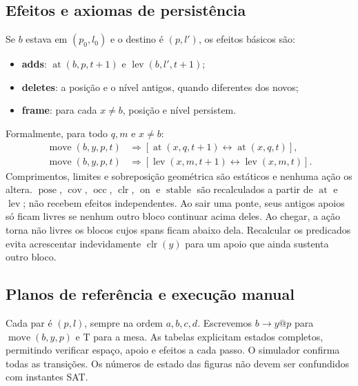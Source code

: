 \documentclass[11pt,a4paper]{article}
\newcommand{\at}{\operatorname{at}}
\newcommand{\lev}{\operatorname{lev}}
\newcommand{\clr}{\operatorname{clr}}
\newcommand{\On}{\operatorname{on}}
\newcommand{\cov}{\operatorname{cov}}
\newcommand{\occ}{\operatorname{occ}}
\newcommand{\pose}{\operatorname{pose}}
\newcommand{\stable}{\operatorname{stable}}
\newcommand{\mv}{\operatorname{move}}
\newcommand{\T}{\mathrm{T}}
\begin{document}
\subsection{Efeitos e axiomas de persistência}
Se $b$ estava em $(p_0,l_0)$ e o destino é $(p,l')$, os efeitos básicos são:
\begin{itemize}
\item \textbf{adds}: $\at(b,p,t+1)$ e $\lev(b,l',t+1)$;
\item \textbf{deletes}: a posição e o nível antigos, quando diferentes dos novos;
\item \textbf{frame}: para cada $x\neq b$, posição e nível persistem.
\end{itemize}
Formalmente, para todo $q,m$ e $x\neq b$:
\begin{align}
\mv(b,y,p,t)&\Rightarrow[\at(x,q,t+1)\leftrightarrow\at(x,q,t)],\\
\mv(b,y,p,t)&\Rightarrow[\lev(x,m,t+1)\leftrightarrow\lev(x,m,t)].
\end{align}
Comprimentos, limites e sobreposição geométrica são estáticos e nenhuma ação os altera. $\pose$, $\cov$, $\occ$, $\clr$, $\On$ e $\stable$ são recalculados a partir de $\at$ e $\lev$; não recebem efeitos independentes. Ao sair uma ponte, seus antigos apoios só ficam livres se nenhum outro bloco continuar acima deles. Ao chegar, a ação torna não livres os blocos cujos spans ficam abaixo dela. Recalcular os predicados evita acrescentar indevidamente $\clr(y)$ para um apoio que ainda sustenta outro bloco.


\subsection{Planos de referência e execução manual}
Cada par é $(p,l)$, sempre na ordem $a,b,c,d$. Escrevemos $b\to y@p$ para $\mv(b,y,p)$ e $\T$ para a mesa. As tabelas explicitam estados completos, permitindo verificar espaço, apoio e efeitos a cada passo. O simulador confirma todas as transições. Os números de estado das figuras não devem ser confundidos com instantes SAT.
\end{document}
